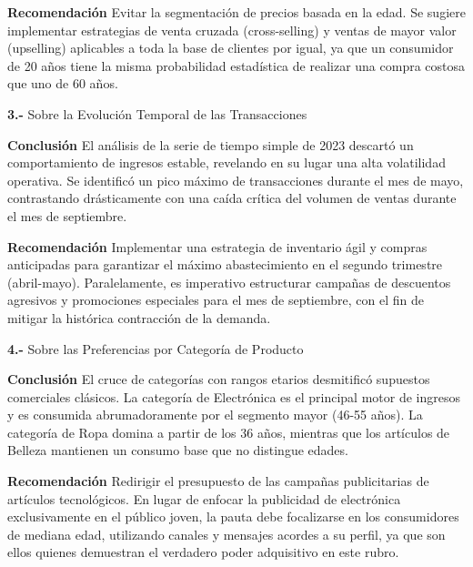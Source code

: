 \documentclass[oneside,11pt]{Latex/Classes/PhDthesisPSnPDF}
\begin{document}
\textbf{Recomendación} Evitar la segmentación de precios basada en la
edad. Se sugiere implementar estrategias de venta cruzada
(cross-selling) y ventas de mayor valor (upselling) aplicables a toda la
base de clientes por igual, ya que un consumidor de 20 años tiene la
misma probabilidad estadística de realizar una compra costosa que uno de
60 años.

\textbf{3.-} Sobre la Evolución Temporal de las Transacciones

\textbf{Conclusión} El análisis de la serie de tiempo simple de 2023
descartó un comportamiento de ingresos estable, revelando en su lugar
una alta volatilidad operativa. Se identificó un pico máximo de
transacciones durante el mes de mayo, contrastando drásticamente con una
caída crítica del volumen de ventas durante el mes de septiembre.

\textbf{Recomendación} Implementar una estrategia de inventario ágil y
compras anticipadas para garantizar el máximo abastecimiento en el
segundo trimestre (abril-mayo). Paralelamente, es imperativo estructurar
campañas de descuentos agresivos y promociones especiales para el mes de
septiembre, con el fin de mitigar la histórica contracción de la
demanda.

\textbf{4.-} Sobre las Preferencias por Categoría de Producto

\textbf{Conclusión} El cruce de categorías con rangos etarios
desmitificó supuestos comerciales clásicos. La categoría de Electrónica
es el principal motor de ingresos y es consumida abrumadoramente por el
segmento mayor (46-55 años). La categoría de Ropa domina a partir de los
36 años, mientras que los artículos de Belleza mantienen un consumo base
que no distingue edades.

\textbf{Recomendación} Redirigir el presupuesto de las campañas
publicitarias de artículos tecnológicos. En lugar de enfocar la
publicidad de electrónica exclusivamente en el público joven, la pauta
debe focalizarse en los consumidores de mediana edad, utilizando canales
y mensajes acordes a su perfil, ya que son ellos quienes demuestran el
verdadero poder adquisitivo en este rubro.

\appendix
\renewcommand{\thechapter}{\Alph{chapter}}

\renewcommand{\bibname}{Lista de Referencias}
 
 

\end{document}
